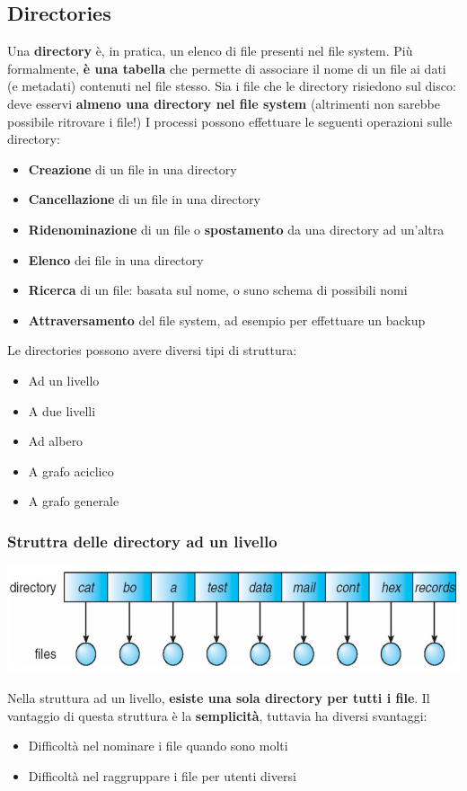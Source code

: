 \documentclass[12pt]{article}
\begin{document}
\subsection{Directories}
Una \textbf{directory} è, in pratica, un elenco di file presenti nel file system.
Più formalmente, \textbf{è una tabella} che permette di associare il nome di un file ai dati (e metadati) contenuti nel file stesso.
Sia i file che le directory risiedono sul disco: deve esservi \textbf{almeno una directory nel file system} (altrimenti non sarebbe possibile ritrovare i file!)
I processi possono effettuare le seguenti operazioni sulle directory:
\begin{itemize}
    \item \textbf{Creazione} di un file in una directory
    \item \textbf{Cancellazione} di un file in una directory
    \item \textbf{Ridenominazione} di un file o \textbf{spostamento} da una directory ad un'altra
    \item \textbf{Elenco} dei file in una directory
    \item \textbf{Ricerca} di un file: basata sul nome, o suno schema di possibili nomi
    \item \textbf{Attraversamento} del file system, ad esempio per effettuare un backup
\end{itemize}
Le directories possono avere diversi tipi di struttura:
\begin{itemize}
    \item Ad un livello
    \item A due livelli
    \item Ad albero
    \item A grafo aciclico
    \item A grafo generale
\end{itemize}
\subsubsection{Struttra delle directory ad un livello}
\begin{center}
    \includegraphics[width = 0.60\linewidth]{Images/25.png}
\end{center}
Nella struttura ad un livello, \textbf{esiste una sola directory per tutti i file}.
Il vantaggio di questa struttura è la \textbf{semplicità}, tuttavia ha diversi svantaggi:
\begin{itemize}
    \item Difficoltà nel nominare i file quando sono molti
    \item Difficoltà nel raggruppare i file per utenti diversi
\end{itemize}
\end{document}
